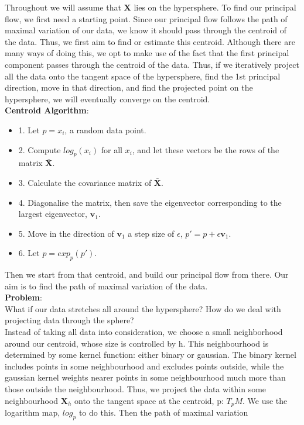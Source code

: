 \documentclass[12pt]{report}
\begin{document}
Throughout we will assume that \textbf{X} lies on the hypersphere. 
To find our principal flow, we first need a starting point. Since our principal flow 
follows the path of maximal variation of our data, 
we know it should pass through the centroid of the data. 
Thus, we first aim to find or estimate this centroid.
Although there are many ways of doing this, we opt to make use of the fact that 
the first principal component passes through the centroid of the data. Thus, if we 
iteratively project all the data onto the tangent space of the hypersphere, 
find the 1st principal direction, move in that direction, 
and find the projected point on the hypersphere, we will eventually converge on the 
centroid.
\\
\textbf{Centroid Algorithm}:
\begin{itemize}
    \item 1. Let $p = x_i$, a random data point.
    \item 2. Compute $log_p(x_i)$ for all $x_i$, and let these vectors be the rows of the matrix $\bar{\textbf{X}}$.
    \item 3. Calculate the covariance matrix of $\bar{\textbf{X}}$.
    \item 4. Diagonalise the matrix, then save the eigenvector corresponding to the largest eigenvector, $\textbf{v}_1$.
    \item 5. Move in the direction of $\textbf{v}_1$ a step size of $\epsilon$, $p' = p + \epsilon \textbf{v}_1$.
    \item 6. Let $p = exp_p(p')$.
\end{itemize}
Then we start from that centroid, and build our principal flow from there.
Our aim is to find the path of maximal variation of the data.\\
\textbf{Problem}:\\
What if our data stretches all around the hypersphere? How do we deal with projecting
data through the sphere?\\
Instead of taking all data into consideration, we choose a small neighborhood around
our centroid, whose size is controlled by h. This neighbourhood is determined 
by some kernel function: either binary or gaussian. The binary kernel 
includes points in some neighbourhood and excludes points outside,
while the gaussian kernel weights nearer points in some neighbourhood 
much more than those outside the neighbourhood. Thus, we
project the data within some neighbourhood $\textbf{X}_h$ onto the tangent space 
at the centroid, p: $T_pM$. We use the logarithm map, $log_p$ to do this. Then the path of maximal variation 
\end{document}
